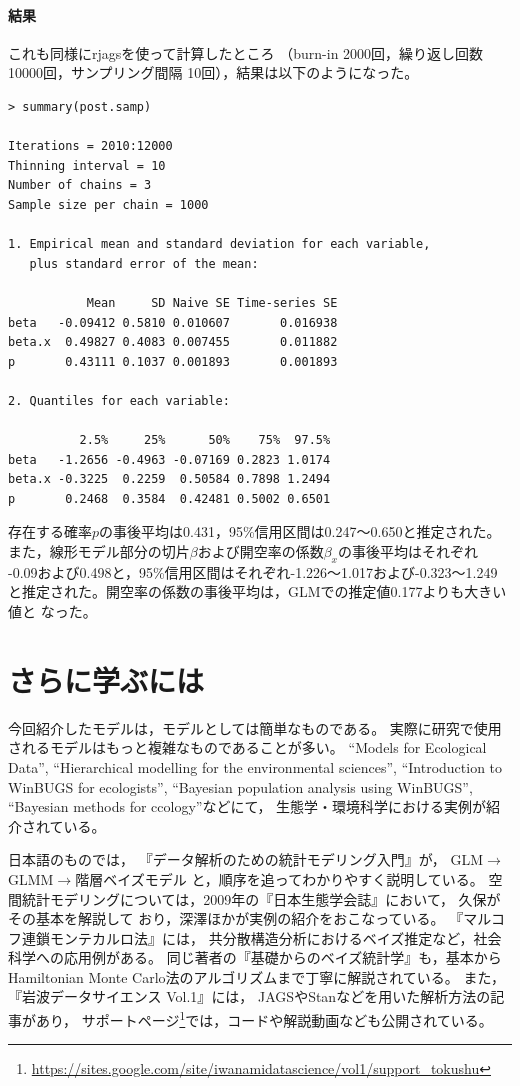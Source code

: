\documentclass[11pt,uplatex]{jsarticle}
\begin{document}
\paragraph{結果}
これも同様に\textsf{rjags}を使って計算したところ
（burn-in 2000回，繰り返し回数 10000回，サンプリング間隔 10回），結果は以下のようになった。

\begin{lstlisting}
> summary(post.samp)

Iterations = 2010:12000
Thinning interval = 10 
Number of chains = 3 
Sample size per chain = 1000 

1. Empirical mean and standard deviation for each variable,
   plus standard error of the mean:

           Mean     SD Naive SE Time-series SE
beta   -0.09412 0.5810 0.010607       0.016938
beta.x  0.49827 0.4083 0.007455       0.011882
p       0.43111 0.1037 0.001893       0.001893

2. Quantiles for each variable:

          2.5%     25%      50%    75%  97.5%
beta   -1.2656 -0.4963 -0.07169 0.2823 1.0174
beta.x -0.3225  0.2259  0.50584 0.7898 1.2494
p       0.2468  0.3584  0.42481 0.5002 0.6501

\end{lstlisting}
存在する確率$p$の事後平均は0.431，95\%信用区間は0.247〜0.650と推定された。
また，線形モデル部分の切片$\beta$および開空率の係数$\beta_{x}$の事後平均はそれぞれ
-0.09および0.498と，95\%信用区間はそれぞれ-1.226〜1.017および-0.323〜1.249
と推定された。開空率の係数の事後平均は，GLMでの推定値0.177よりも大きい値と
なった。


\section{さらに学ぶには}

今回紹介したモデルは，モデルとしては簡単なものである。
実際に研究で使用されるモデルはもっと複雑なものであることが多い。
``Models for Ecological Data''\cite{Clark},
``Hierarchical modelling for the environmental sciences''\cite{Clark_Gelfand},
``Introduction to WinBUGS for ecologists''\cite{IWE},
``Bayesian population analysis using WinBUGS''\cite{BPA},
``Bayesian methods for ccology''\cite{McCarthy}などにて，
生態学・環境科学における実例が紹介されている。

日本語のものでは，
『データ解析のための統計モデリング入門』\cite{Kubo:Modeling}が，
GLM$\rightarrow$GLMM$\rightarrow$階層ベイズモデル
と，順序を追ってわかりやすく説明している。
空間統計モデリングについては，2009年の『日本生態学会誌』において，
久保\cite{Kubo}がその基本を解説して
おり，深澤ほか\cite{Fukasawa_et_al}が実例の紹介をおこなっている。
『マルコフ連鎖モンテカルロ法』\cite{Toyoda}には，
共分散構造分析におけるベイズ推定など，社会科学への応用例がある。
同じ著者の『基礎からのベイズ統計学』\cite{Toyoda2015}も，基本から
Hamiltonian Monte Carlo法のアルゴリズムまで丁寧に解説されている。
また，『岩波データサイエンス Vol.1』\cite{Iwanami_vol1}には，
\textsf{JAGS}や\textsf{Stan}などを用いた解析方法の記事があり，
サポートページ\footnote{\url{https://sites.google.com/site/iwanamidatascience/vol1/support_tokushu}}では，コードや解説動画なども公開されている。
\end{document}
